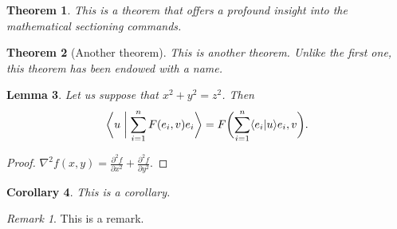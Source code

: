 \documentclass[
  digital, %
  table,   %
  lof,     %
  lot,     %
]{fithesis3}
\begin{document}
\newtheorem{theorem}{Theorem}[section] %
\newtheorem{lemma}[theorem]{Lemma}         %
\newtheorem{corollary}[theorem]{Corollary} %
\theoremstyle{definition}
\newtheorem{definition}{Definition}
\theoremstyle{remark}
\newtheorem*{remark}{Remark}

\begin{theorem}
  This is a theorem that offers a profound insight into the
  mathematical sectioning commands.
\end{theorem}
\begin{theorem}[Another theorem]
  This is another theorem. Unlike the first one, this theorem has
  been endowed with a name.
\end{theorem}
\begin{lemma}
  Let us suppose that $x^2+y^2=z^2$. Then
  \begin{equation}
    \biggl\langle u\biggm|\sum_{i=1}^nF(e_i,v)e_i\biggr\rangle
    =F\biggl(\sum_{i=1}^n\langle e_i|u\rangle e_i,v\biggr).
  \end{equation}
\end{lemma}
\begin{proof}
  $\nabla^2 f(x,y)=\frac{\partial^2f}{\partial x^2}+
   \frac{\partial^2f}{\partial y^2}$.
\end{proof}
\begin{corollary}
  This is a corollary.
\end{corollary}
\begin{remark}
  This is a remark.
\end{remark}
\end{document}

